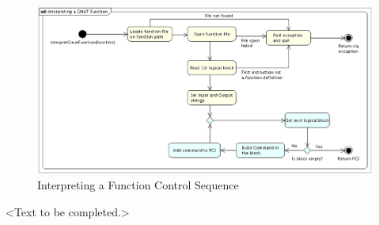 \begin{figure}[htb]
\begin{center}
\includegraphics[scale=0.5]{Images/InterpretingaGMATFunction.eps}
\caption{\label{figure:InterpretGmatFunction}Interpreting a Function Control Sequence}
\end{center}
\end{figure}


<Text to be completed.>